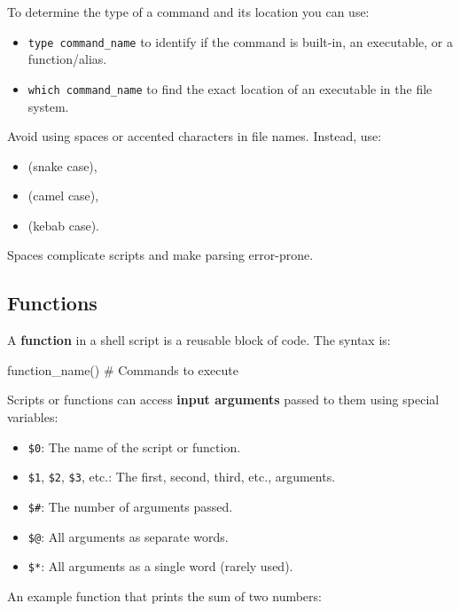 To determine the type of a command and its location you can use:
\begin{itemize}
    \item \texttt{type command\_name} to identify if the command is built-in, an executable, or a function/alias.
    \item \texttt{which command\_name} to find the exact location of an executable in the file system.
\end{itemize}

\newpage

\begin{warningblock}
    Avoid using spaces or accented characters in file names. Instead, use:
    \begin{itemize}
        \item {} (snake case),
        \item {} (camel case),
        \item {} (kebab case).
    \end{itemize}
    Spaces complicate scripts and make parsing error-prone.
\end{warningblock}

\subsection{Functions}

A \textbf{function} in a shell script is a reusable block of code. The syntax is:
\begin{codeblock}[language=bash]
function_name() {
    # Commands to execute
}
\end{codeblock}

Scripts or functions can access \textbf{input arguments} passed to them using special variables:
\begin{itemize}
    \item \texttt{\$0}: The name of the script or function.
    \item \texttt{\$1}, \texttt{\$2}, \texttt{\$3}, etc.: The first, second, third, etc., arguments.
    \item \texttt{\$\#}: The number of arguments passed.
    \item \texttt{\$@}: All arguments as separate words.
    \item \texttt{\$*}: All arguments as a single word (rarely used).
\end{itemize}

\begin{exampleblock}
    An example function that prints the sum of two numbers:
\end{exampleblock}

